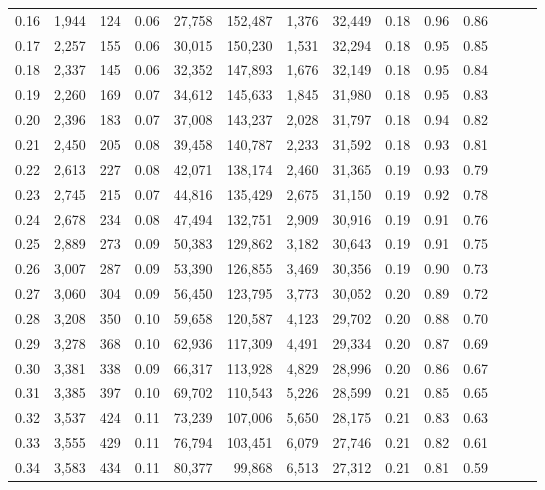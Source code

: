 \begin{tabular}{rrrrrrrrrrrrrr}
0.16 &  1,944 &  124 &  0.06 &   27,758 &  152,487 &   1,376 &  32,449 &  0.18 &  0.96 &      0.86 \\
0.17 &  2,257 &  155 &  0.06 &   30,015 &  150,230 &   1,531 &  32,294 &  0.18 &  0.95 &      0.85 \\
0.18 &  2,337 &  145 &  0.06 &   32,352 &  147,893 &   1,676 &  32,149 &  0.18 &  0.95 &      0.84 \\
0.19 &  2,260 &  169 &  0.07 &   34,612 &  145,633 &   1,845 &  31,980 &  0.18 &  0.95 &      0.83 \\
0.20 &  2,396 &  183 &  0.07 &   37,008 &  143,237 &   2,028 &  31,797 &  0.18 &  0.94 &      0.82 \\
0.21 &  2,450 &  205 &  0.08 &   39,458 &  140,787 &   2,233 &  31,592 &  0.18 &  0.93 &      0.81 \\
0.22 &  2,613 &  227 &  0.08 &   42,071 &  138,174 &   2,460 &  31,365 &  0.19 &  0.93 &      0.79 \\
0.23 &  2,745 &  215 &  0.07 &   44,816 &  135,429 &   2,675 &  31,150 &  0.19 &  0.92 &      0.78 \\
0.24 &  2,678 &  234 &  0.08 &   47,494 &  132,751 &   2,909 &  30,916 &  0.19 &  0.91 &      0.76 \\
0.25 &  2,889 &  273 &  0.09 &   50,383 &  129,862 &   3,182 &  30,643 &  0.19 &  0.91 &      0.75 \\
0.26 &  3,007 &  287 &  0.09 &   53,390 &  126,855 &   3,469 &  30,356 &  0.19 &  0.90 &      0.73 \\
0.27 &  3,060 &  304 &  0.09 &   56,450 &  123,795 &   3,773 &  30,052 &  0.20 &  0.89 &      0.72 \\
0.28 &  3,208 &  350 &  0.10 &   59,658 &  120,587 &   4,123 &  29,702 &  0.20 &  0.88 &      0.70 \\
0.29 &  3,278 &  368 &  0.10 &   62,936 &  117,309 &   4,491 &  29,334 &  0.20 &  0.87 &      0.69 \\
0.30 &  3,381 &  338 &  0.09 &   66,317 &  113,928 &   4,829 &  28,996 &  0.20 &  0.86 &      0.67 \\
0.31 &  3,385 &  397 &  0.10 &   69,702 &  110,543 &   5,226 &  28,599 &  0.21 &  0.85 &      0.65 \\
0.32 &  3,537 &  424 &  0.11 &   73,239 &  107,006 &   5,650 &  28,175 &  0.21 &  0.83 &      0.63 \\
0.33 &  3,555 &  429 &  0.11 &   76,794 &  103,451 &   6,079 &  27,746 &  0.21 &  0.82 &      0.61 \\
0.34 &  3,583 &  434 &  0.11 &   80,377 &   99,868 &   6,513 &  27,312 &  0.21 &  0.81 &      0.59 \\

\end{tabular}
